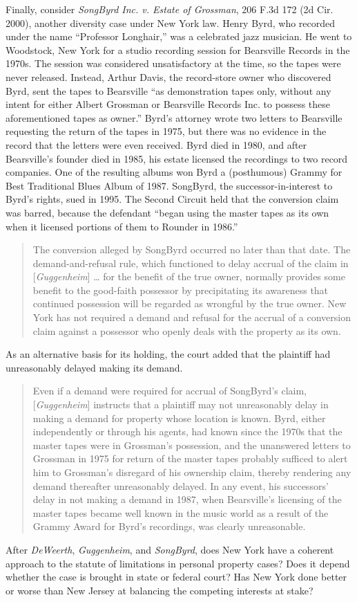 Finally, consider \textit{SongByrd Inc. v. Estate of Grossman}, 206 F.3d 172 (2d
Cir. 2000), another diversity case under New York law. Henry Byrd, who recorded
under the name ``Professor Longhair,'' was a celebrated jazz musician. He went
to Woodstock, New York for a studio recording session for Bearsville Records in
the 1970s. The session was considered unsatisfactory at the time, so the tapes
were never released. Instead, Arthur Davis, the record-store owner who
discovered Byrd, sent the tapes to Bearsville ``as demonstration tapes only,
without any intent for either Albert Grossman or Bearsville Records Inc. to
possess these aforementioned tapes as owner.'' Byrd's attorney wrote two
letters to Bearsville requesting the return of the tapes in 1975, but there was
no evidence in the record that the letters were even received. Byrd died in
1980, and after Bearsville's founder died in 1985, his estate licensed the
recordings to two record companies. One of the resulting albums won Byrd a
(posthumous) Grammy for Best Traditional Blues Album of 1987. SongByrd, the
successor-in-interest to Byrd's rights, sued in 1995. The Second Circuit held
that the conversion claim was barred, because the defendant ``began using the
master tapes as its own when it licensed portions of them to Rounder in 1986.''
\begin{quote}
The conversion alleged by SongByrd occurred no later than that date. The
demand-and-refusal rule, which functioned to delay accrual of the claim in
[\textit{Guggenheim}] \dots{} for the benefit of the true owner, normally
provides some benefit to the good-faith possessor by precipitating its
awareness that continued possession will be regarded as wrongful by the true
owner. New York has not required a demand and refusal for the accrual of a
conversion claim against a possessor who openly deals with the property as its
own. 
\end{quote}
As an alternative basis for its holding, the court added that the plaintiff had
unreasonably delayed making its demand.
\begin{quote}
Even if a demand were required for accrual of SongByrd's claim,
[\textit{Guggenheim}] instructs that a plaintiff may not unreasonably delay in
making a demand for property whose location is known. Byrd, either
independently or through his agents, had known since the 1970s that the master
tapes were in Grossman's possession, and the unanswered letters to Grossman in
1975 for return of the master tapes probably sufficed to alert him to
Grossman's disregard of his ownership claim, thereby rendering any demand
thereafter unreasonably delayed. In any event, his successors' delay in not
making a demand in 1987, when Bearsville's licensing of the master tapes became
well known in the music world as a result of the Grammy Award for Byrd's
recordings, was clearly unreasonable.
\end{quote}

After \textit{DeWeerth}, \textit{Guggenheim}, and \textit{SongByrd}, does New
York have a coherent approach to the statute of limitations in personal
property cases? Does it depend whether the case is brought in state or federal
court? Has New York done better or worse than New Jersey at balancing the
competing interests at stake?


